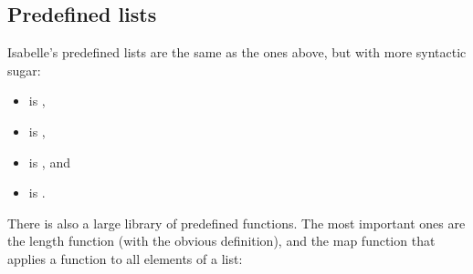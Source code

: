 \begin{isabellebody}
\begin{isamarkuptext}
\subsection{Predefined lists}
\label{sec:predeflists}

Isabelle's predefined lists are the same as the ones above, but with
more syntactic sugar:
\begin{itemize}
\item {} is ,
\item {} is ,
\item {} is , and
\item {} is .
\end{itemize}
There is also a large library of predefined functions.
The most important ones are the length function
 (with the obvious definition),
and the map function that applies a function to all elements of a list:
\begin{isabelle}
 \\
 \\

\end{isabelle}
\end{isamarkuptext}
\end{isabellebody}
